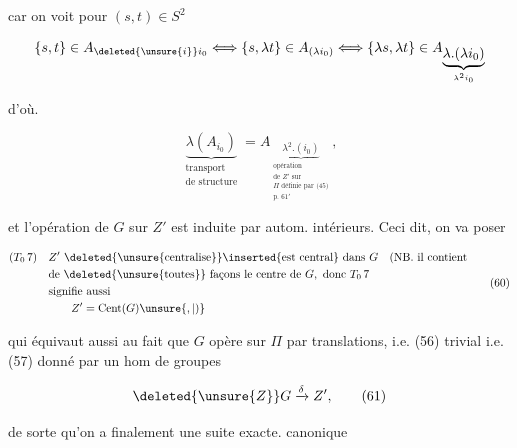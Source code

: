 car on voit  pour $(s,t)\in S^2$

\[
\{s,t\}\in A_{\deleted{\unsure{i}}i_0}\Longleftrightarrow
\{s,\lambda t\}\in A_{(\lambda i_0)}\Longleftrightarrow
\{\lambda s,\lambda t\}\in A_{\underbrace{\lambda.(\lambda i_0)}_{\lambda^2 i_0}}
\]

d'où.

\[
\underbrace{\lambda(A_{i_0})}_{\substack{\text{transport}\\\text{de structure}}}
=A_{\underbrace{\lambda^2.(i_0)}_{\substack{\text{opération}\\\text{de }Z'\text{ sur}\\\Pi\text{ définie par (45)}\\\text{p. }61'}}}, \tag*{(59)}
\]


et l'opération de $G$ sur $Z'$ est induite par autom. intérieurs. Ceci dit, on va poser

\[
\begin{aligned}
(T_0\,7)\quad&Z'\ \deleted{\text{\unsure{centralise}}}\inserted{\text{est central}}\text{ dans }G\quad\text{(NB. il contient}\\
&\text{de }\deleted{\text{\unsure{toutes}}}\text{ façons le centre de }G,\text{ donc }T_0\,7\\
&\text{signifie aussi}\\
&\hspace{2em}Z'=\operatorname{Cent}(G)\unsure{,|)}
\end{aligned}\tag*{(60)}
\]

qui équivaut aussi au fait que $G$ opère sur $\Pi$ par translations, i.e. (56) trivial i.e. (57) donné par un hom de groupes

\[
\deleted{\unsure{Z}}G\xrightarrow{\delta}Z', \tag*{(61)}
\]

de sorte qu'on a finalement une suite exacte. canonique
